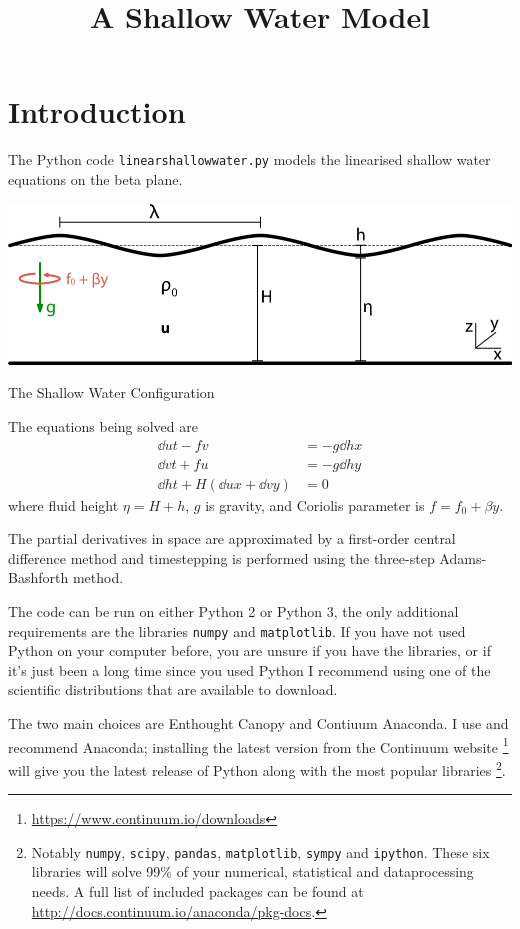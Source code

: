 \documentclass[a4paper, sfsidenotes, twoside]{tufte-handout}
\title{A Shallow Water Model}
\begin{document}
  \section{Introduction}
  \label{sec:Introduction}
  The Python code \texttt{linearshallowwater.py} models the linearised shallow
  water equations on the beta plane.
  \begin{marginfigure}[1in]
    \includegraphics{shallow_water}
    \caption{The Shallow Water Configuration}
    \label{fig:shallow}
  \end{marginfigure}
  The equations being solved are
  \begin{subequations}
    \label{eqn:sw}
    \begin{align}
      \dd{u}{t} - fv &= - g \dd{h}{x} \\
      \dd{v}{t} + fu &= - g \dd{h}{y} \\
      \dd{h}{t} + H(\dd{u}{x} + \dd{v}{y}) &= 0
    \end{align}
  \end{subequations}
  where fluid height $\eta = H + h$, $g$ is gravity, and Coriolis parameter is $f=f_0 + \beta y$.

  The partial derivatives in space are approximated by a first-order central
  difference method and timestepping is performed using the three-step Adams-Bashforth method.

  The code can be run on either Python 2 or Python 3, the only additional requirements are the libraries \texttt{numpy} and \texttt{matplotlib}.
  If you have not used Python on your computer before, you are unsure if you have the libraries, or if it's just been a long time since you used Python I recommend using one of the scientific distributions that are available to download.

  The two main choices are Enthought Canopy and Contiuum Anaconda.
  I use and recommend Anaconda; installing the latest version from the Continuum website \footnote{\url{https://www.continuum.io/downloads}} will give you the latest release of Python along with the most popular libraries \footnote{Notably \texttt{numpy}, \texttt{scipy}, \texttt{pandas}, \texttt{matplotlib}, \texttt{sympy} and \texttt{ipython}.  These six libraries will solve 99\% of your numerical, statistical and dataprocessing needs.
  A full list of included packages can be found at \url{http://docs.continuum.io/anaconda/pkg-docs}.}.
\end{document}
